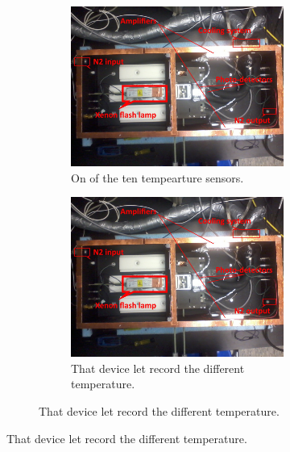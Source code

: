 \documentclass[a4paper, 11pt]{report}%
\begin{document}
\begin{figure}[!hbtp]
  \begin{figure}[!hbtp]
  \centering
  \begin{subfigure}{.5\textwidth}
    \includegraphics[totalheight=.35\textwidth,trim=0cm 7cm 0cm 2.5cm, clip=true,]{../Pictures/blabla/box.jpg}%
    \caption{On of the ten tempearture sensors.}
    \label{fig:beam_splitter}
  \end{subfigure}%
  \begin{subfigure}{.5\textwidth}
    \includegraphics[totalheight=.35\textwidth,trim=0cm 7cm 0cm 2.5cm, clip=true,]{../Pictures/blabla/box.jpg}
    \caption{That device let record the different temperature.}
    \label{fig:filters}
  \end{subfigure}
  \end{figure}
  

\end{figure}
\end{document}
